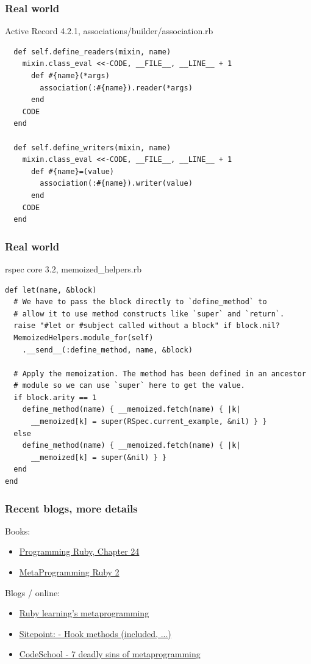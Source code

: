 \begin{frame}[fragile]\frametitle{Real world}
  Active Record 4.2.1, associations/builder/association.rb
\begin{lstlisting}
  def self.define_readers(mixin, name)
    mixin.class_eval <<-CODE, __FILE__, __LINE__ + 1
      def #{name}(*args)
        association(:#{name}).reader(*args)
      end
    CODE
  end

  def self.define_writers(mixin, name)
    mixin.class_eval <<-CODE, __FILE__, __LINE__ + 1
      def #{name}=(value)
        association(:#{name}).writer(value)
      end
    CODE
  end
\end{lstlisting}
\end{frame}
\begin{frame}[fragile]\frametitle{Real world}
  rspec core $3.2$, memoized\_helpers.rb
\begin{lstlisting}[basicstyle=\scriptsize\ttfamily]
def let(name, &block)
  # We have to pass the block directly to `define_method` to
  # allow it to use method constructs like `super` and `return`.
  raise "#let or #subject called without a block" if block.nil?
  MemoizedHelpers.module_for(self)
    .__send__(:define_method, name, &block)

  # Apply the memoization. The method has been defined in an ancestor
  # module so we can use `super` here to get the value.
  if block.arity == 1
    define_method(name) { __memoized.fetch(name) { |k|
      __memoized[k] = super(RSpec.current_example, &nil) } }
  else
    define_method(name) { __memoized.fetch(name) { |k|
      __memoized[k] = super(&nil) } }
  end
end
\end{lstlisting}
\end{frame}
\begin{frame}\frametitle{Recent blogs, more details}
  Books:
  \begin{itemize}
    \item \href{https://pragprog.com/book/ruby4/programming-ruby-1-9-2-0}{Programming Ruby, Chapter 24}
    \item \href{https://pragprog.com/book/ppmetr2/metaprogramming-ruby-2}{MetaProgramming Ruby 2}
  \end{itemize}
  Blogs / online:
  \begin{itemize}
    \item \href{http://ruby-metaprogramming.rubylearning.com/}{Ruby learning's metaprogramming}
    \item \href{http://www.sitepoint.com/rubys-important-hook-methods/}{Sitepoint: - Hook methods (included, ...)}
    \item \href{https://www.codeschool.com/blog/2015/04/24/7-deadly-sins-of-ruby-metaprogramming/}{CodeSchool - 7 deadly sins of metaprogramming}
  \end{itemize}
\end{frame}
